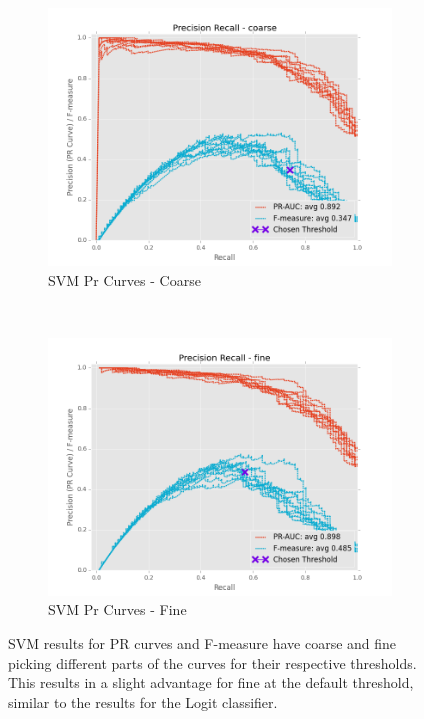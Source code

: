 \documentclass[ms]{nuthesis}
\begin{document}
\FloatBarrier
\begin{figure}[!htb]
    \centering
    \begin{subfigure}[t]{0.5\textwidth}
        \centering
        \includegraphics[width=\textwidth]{fig/SVM_FindThreshold_PrCurve_coarse}
        \caption{SVM Pr Curves - Coarse}
    \end{subfigure}%
    ~
    \begin{subfigure}[t]{0.5\textwidth}
        \centering
        \includegraphics[width=\textwidth]{fig/SVM_FindThreshold_PrCurve_fine}
        \caption{SVM Pr Curves - Fine}
    \end{subfigure}
    \caption{SVM results for PR curves and F-measure have coarse and fine picking
    different parts of the curves for their respective thresholds. This results in a slight
    advantage for fine at the default threshold, similar to the results for the Logit classifier.}
    \label{fig:SVMThreshPr}
\end{figure}
\FloatBarrier
\end{document}

